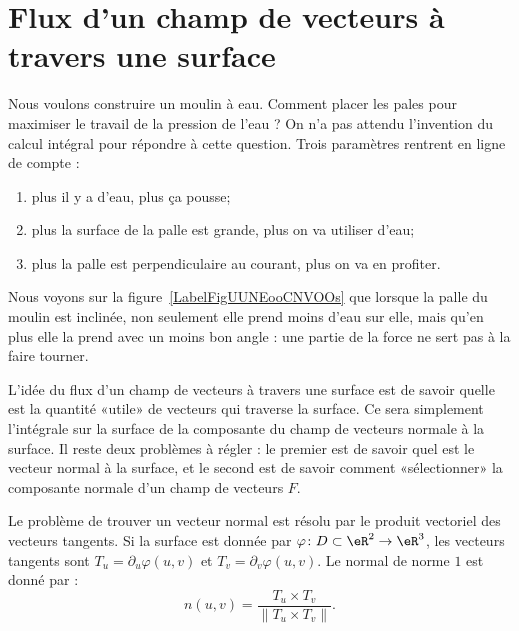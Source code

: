 \section{Flux d'un champ de vecteurs à travers une surface}

Nous voulons construire un moulin à eau. Comment placer les pales pour maximiser le travail de la pression de l'eau ? On n'a pas attendu l'invention du calcul intégral pour répondre à cette question. Trois paramètres rentrent en ligne de compte :
\begin{enumerate}
	\item
	      plus il y a d'eau, plus ça pousse;
	\item
	      plus la surface de la palle est grande, plus on va utiliser d'eau;
	\item
	      plus la palle est perpendiculaire au courant, plus on va en profiter.
\end{enumerate}
Nous voyons sur la figure~\ref{LabelFigUUNEooCNVOOs} que lorsque la palle du moulin est inclinée, non seulement elle prend moins d'eau sur elle, mais qu'en plus elle la prend avec un moins bon angle : une partie de la force ne sert pas à la faire tourner.

\newcommand{\CaptionFigUUNEooCNVOOs}{La partie rouge de la force est perdue si l'eau ne pousse pas perpendiculairement. De plus lorsque la palle est inclinée, elle prend moins d'eau sur elle.}


L'idée du flux d'un champ de vecteurs à travers une surface est de savoir quelle est la quantité «utile» de vecteurs qui traverse la surface. Ce sera simplement l'intégrale sur la surface de la composante du champ de vecteurs normale à la surface. Il reste deux problèmes à régler : le premier est de savoir quel est le vecteur normal à la surface, et le second est de savoir comment «sélectionner» la composante normale d'un champ de vecteurs \( F\).

Le problème de trouver un vecteur normal est résolu par le produit vectoriel des vecteurs tangents. Si la surface est donnée par \( \varphi\colon D\subset\eR^2\to \eR^3\), les vecteurs tangents sont \( T_u=\partial_u\varphi(u,v)\) et  \( T_v=\partial_v\varphi(u,v)\). Le normal de norme \( 1\) est donné par :
\begin{equation}
	n(u,v)=\frac{ T_u\times T_v }{ \| T_u\times T_v \| }.
\end{equation}


